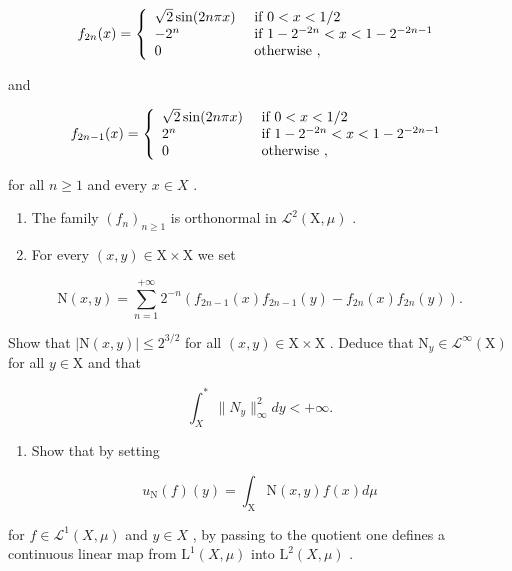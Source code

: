 \[
f _ {2 n} (x) = \left\{ \begin{array}{l l} \sqrt {2} \sin (2 n \pi x) & \text { if } 0 <   x <   1 / 2 \\ - 2 ^ {n} & \text { if } 1 - 2 ^ {- 2 n} <   x <   1 - 2 ^ {- 2 n - 1} \\ 0 & \text { otherwise }, \end{array} \right.
\]

and

\[
f _ {2 n - 1} (x) = \left\{ \begin{array}{l l} \sqrt {2} \sin (2 n \pi x) & \text { if } 0 <   x <   1 / 2 \\ 2 ^ {n} & \text { if } 1 - 2 ^ {- 2 n} <   x <   1 - 2 ^ {- 2 n - 1} \\ 0 & \text { otherwise }, \end{array} \right.
\]

for all \(n \geqslant 1\) and every \(x \in X\) .

\begin{enumerate}
\def\labelenumi{\alph{enumi})}
\item
  The family \((f_n)_{n\geqslant 1}\) is orthonormal in \(\mathcal{L}^2 (\mathrm{X},\mu)\) .
\item
  For every \((x,y)\in \mathrm{X}\times \mathrm{X}\) we set
\end{enumerate}

\[
\mathrm{N} (x, y) = \sum_ {n = 1} ^ {+ \infty} 2 ^ {- n} (f _ {2 n - 1} (x) f _ {2 n - 1} (y) - f _ {2 n} (x) f _ {2 n} (y)).
\]

Show that \(|\mathrm{N}(x,y)| \leqslant 2^{3/2}\) for all \((x,y) \in \mathrm{X} \times \mathrm{X}\) . Deduce that \(\mathrm{N}_y \in \mathcal{L}^\infty(\mathrm{X})\) for all \(y \in \mathrm{X}\) and that

\[
\int_ {X} ^ {*} \| N _ {y} \| _ {\infty} ^ {2} d y <   + \infty .
\]

\begin{enumerate}
\def\labelenumi{\alph{enumi})}
\setcounter{enumi}{2}
\tightlist
\item
  Show that by setting
\end{enumerate}

\[
u _ {\mathrm{N}} (f) (y) = \int_ {\mathrm{X}} \mathrm{N} (x, y) f (x) d \mu
\]

for \(f \in \mathcal{L}^{1}(X, \mu)\) and \(y \in X\) , by passing to the quotient one defines a continuous linear map from \(\mathrm{L}^{1}(X, \mu)\) into \(\mathrm{L}^{2}(X, \mu)\) .

